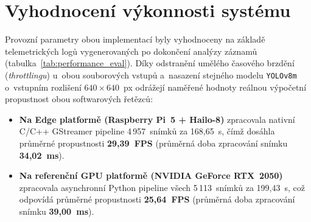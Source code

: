 \section{Vyhodnocení výkonnosti systému}

Provozní parametry obou implementací byly vyhodnoceny na základě telemetrických logů vygenerovaných po dokončení analýzy záznamů (tabulka~\ref{tab:performance_eval}). Díky odstranění umělého časového brzdění (\textit{throttlingu}) u~obou souborových vstupů a~nasazení stejného modelu \texttt{YOLOv8m} o~vstupním rozlišení $640 \times 640$~px odrážejí naměřené hodnoty reálnou výpočetní propustnost obou softwarových řetězců:

\begin{itemize}
    \item \textbf{Na Edge platformě (Raspberry Pi~5 + Hailo-8)} zpracovala nativní C/C++ GStreamer pipeline 4\,957~snímků za 168,65~s, čímž dosáhla průměrné propustnosti \textbf{29,39~FPS} (průměrná doba zpracování snímku \textbf{34,02~ms}).
    \item \textbf{Na referenční GPU platformě (NVIDIA GeForce RTX~2050)} zpracovala asynchronní Python pipeline všech 5\,113~snímků za 199,43~s, což odpovídá průměrné propustnosti \textbf{25,64~FPS} (průměrná doba zpracování snímku \textbf{39,00~ms}).
\end{itemize}

